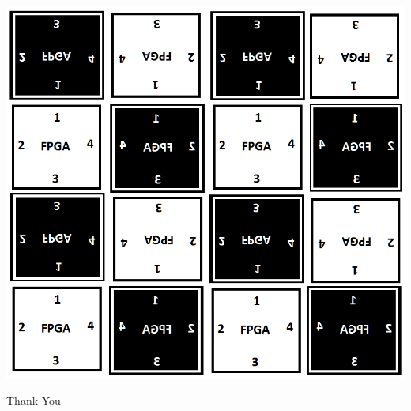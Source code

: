 \begin{frame}
\begin {center}
\includegraphics[scale=0.3]{./figs/MultiFPGANoC}
\end {center}
\end{frame}


\begin{frame}
\begin{center}
Thank You 
\end{center}

\end{frame}

